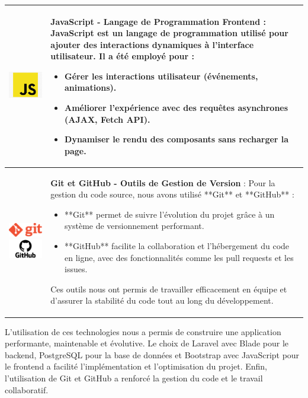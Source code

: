 \begin{longtable}{|m{4cm}|m{10cm}|}
    \includegraphics[width=3cm]{images/logo/javascript.png} & 
    \textbf{JavaScript - Langage de Programmation Frontend} : JavaScript est un langage de programmation utilisé pour ajouter des interactions dynamiques à l'interface utilisateur. Il a été employé pour :  
    \begin{itemize}
        \item Gérer les interactions utilisateur (événements, animations).
        \item Améliorer l'expérience avec des requêtes asynchrones (AJAX, Fetch API).
        \item Dynamiser le rendu des composants sans recharger la page.
    \end{itemize}\\
    \hline

    \includegraphics[width=3cm]{images/logo/git.png}  
    \includegraphics[width=3cm]{images/logo/github.png} & 
    \textbf{Git et GitHub - Outils de Gestion de Version} : Pour la gestion du code source, nous avons utilisé **Git** et **GitHub** :  
    \begin{itemize}
        \item **Git** permet de suivre l'évolution du projet grâce à un système de versionnement performant.
        \item **GitHub** facilite la collaboration et l’hébergement du code en ligne, avec des fonctionnalités comme les pull requests et les issues.
    \end{itemize}
    Ces outils nous ont permis de travailler efficacement en équipe et d’assurer la stabilité du code tout au long du développement.\\
    \hline

\end{longtable}

L’utilisation de ces technologies nous a permis de construire une application performante, maintenable et évolutive. Le choix de Laravel avec Blade pour le backend, PostgreSQL pour la base de données et Bootstrap avec JavaScript pour le frontend a facilité l’implémentation et l’optimisation du projet. Enfin, l’utilisation de Git et GitHub a renforcé la gestion du code et le travail collaboratif.

